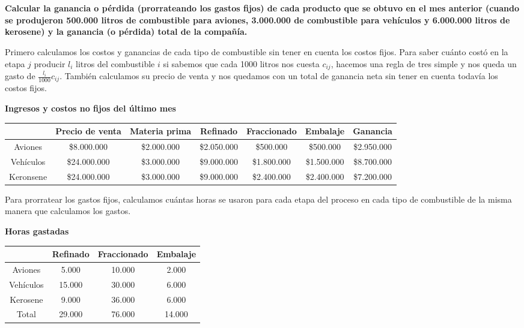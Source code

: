 \documentclass[10pt,a4paper]{article}
\begin{document}
\section{}
\textbf{Calcular la ganancia o pérdida (prorrateando los gastos fijos) de cada producto que se obtuvo en el mes
anterior (cuando se produjeron 500.000 litros de combustible para aviones, 3.000.000 de combustible para
vehículos y 6.000.000 litros de kerosene) y la ganancia (o pérdida) total de la compañía.}

\vspace{5mm}

Primero calculamos los costos y ganancias de cada tipo de combustible sin tener en cuenta los costos fijos. Para saber cuánto costó en la etapa $j$ producir $l_i$ litros del combustible $i$ si sabemos que cada 1000 litros nos cuesta $c_{ij}$, hacemos una regla de tres simple y nos queda un gasto de $\frac{l_i}{1000} c_{ij}$. También calculamos su precio de venta y nos quedamos con un total de ganancia neta sin tener en cuenta todavía los costos fijos.

\begin{center}
	\textbf{Ingresos y costos no fijos del último mes}

	\begin{tabular}{| c || c | c | c | c | c || c |}
		\hline
							& Precio de venta & Materia prima & Refinado     & Fraccionado & Embalaje  & Ganancia\\
		\hline
		Aviones   & \$8.000.000     & \$2.000.000   & \$2.050.000  & \$500.000   & \$500.000 & \$2.950.000  \\
		\hline
		Vehículos & \$24.000.000    & \$3.000.000   & \$9.000.000  & \$1.800.000 & \$1.500.000 & \$8.700.000\\
		\hline
		Keronsene & \$24.000.000    & \$3.000.000   & \$9.000.000  & \$2.400.000 & \$2.400.000 & \$7.200.000 \\
		\hline
	\end{tabular}
\end{center}

Para prorratear los gastos fijos, calculamos cuántas horas se usaron para cada etapa del proceso en cada tipo de combustible de la misma manera que calculamos los gastos.
\begin{center}
	\textbf{Horas gastadas}

	\begin{tabular}{| c || c | c | c |}
		\hline
		&           Refinado & Fraccionado & Embalaje \\
		\hline
		Aviones   & 5.000    & 10.000      & 2.000    \\
		\hline
		Vehículos & 15.000   & 30.000      & 6.000    \\
		\hline
		Kerosene  & 9.000    & 36.000      & 6.000    \\
		\hline
		\hline
		Total     & 29.000   & 76.000      & 14.000   \\
		\hline
	\end{tabular}
\end{center}
\end{document}

